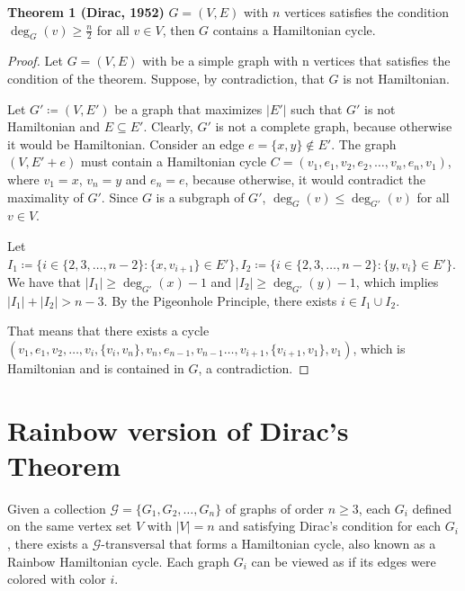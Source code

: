 \textbf{Theorem 1 (Dirac, 1952)} $G = (V, E)$ with $n$ vertices satisfies the condition $\deg_G(v) \geq \frac{n}{2}$ for all $v \in V$, 
then $G$ contains a Hamiltonian cycle.

\begin{proof}
    Let $G = (V, E)$ with be a simple graph with n vertices that satisfies the condition of the theorem. Suppose, 
    by contradiction, that $G$ is not Hamiltonian. 

    Let $G' \coloneqq (V, E')$ be a graph that maximizes $|E'|$ such that $G'$ is not Hamiltonian and $E \subseteq E'$. 
    Clearly, $G'$ is not a complete graph, because otherwise it would be Hamiltonian. Consider an edge $e = \{x, y\} \not\in E'$.
    The graph $(V, E' + e)$ must contain a Hamiltonian cycle $C = (v_1, e_1, v_2, e_2, \ldots, v_n, e_{n}, v_1)$, where 
    $v_1 = x$, $v_n = y$ and $e_n = e$, because otherwise, it would contradict the maximality of $G'$.
    Since $G$ is a subgraph of $G'$, $\deg_G(v) \leq \deg_{G'}(v)$ for all $v \in V$.

    Let $I_1 \coloneqq \{i \in \{2, 3, \dots, n-2\} : \{x, v_{i+1}\} \in E'\}, 
    I_2 \coloneqq \{ i \in \{2, 3, \dots, n - 2\} : \{y, v_{i}\} \in E' \}$.
    We have that $|I_1| \geq \deg_{G'}(x) - 1$ and $|I_2| \geq \deg_{G'}(y) - 1$,
    which implies $|I_1| + |I_2| > n - 3$. By the Pigeonhole Principle, there exists $i \in I_1 \cup I_2$.

    That means that there exists a cycle 
    $(v_1, e_1, v_2, \dots, v_i, \{v_i, v_n\}, v_n, e_{n - 1}, v_{n-1} \dots , v_{i+1}, \{v_{i+1}, v_1\}, v_1)$, 
    which is Hamiltonian and is contained in $G$, a contradiction.

\end{proof}

\section{Rainbow version of Dirac's Theorem}

Given a collection $\mathcal{G} = \{G_1, G_2, \ldots, G_n\}$ of graphs of order $n \geq 3$, each $G_i$ defined
on the same vertex set $V$ with $|V| = n$ and satisfying Dirac's condition for each $G_i$, there exists a 
$\mathcal{G}$-transversal that forms a Hamiltonian cycle, also known as a Rainbow Hamiltonian cycle.
Each graph $G_i$ can be viewed as if its edges were colored with color $i$.